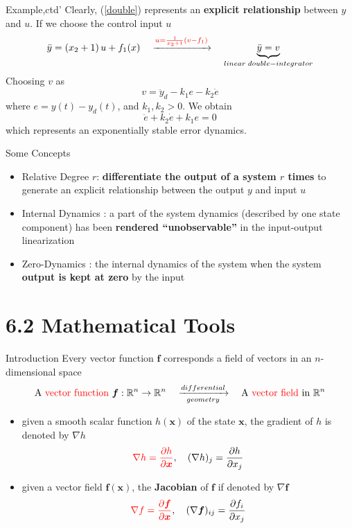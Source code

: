 \documentclass{beamer}
\renewcommand{\vec}[1]{\ensuremath{\boldsymbol{#1}}} %
\begin{document}
\begin{frame}{Example,ctd'}
    Clearly, (\ref{double}) represents an \textbf{explicit relationship} between {\color{red}$y$} and {\color{red}$u$}.  If we choose the control input {\color{red}$u$}
    $$
         \ddot{y}=\left(x_{2}+1\right) u+f_{1}(x) \quad \xrightarrow{ {\color{red}u=\frac{1}{x_{2}+1}\left(v-f_{1}\right)}} \quad \underbrace{\ddot{y} = v}_{\tiny linear~double-integrator}
    $$
    Choosing $v$ as
    \begin{equation}\label{choose-v}
        v = \ddot{y}_{d}-k_{1}e-k_{2}\dot{e}
    \end{equation}
    where $e=y(t)-y_{d}(t)$, and $k_{1}, k_{2} > 0$. We obtain
    $$\ddot{e}+k_{2} \dot{e}+k_{1} e = 0$$
which represents an {\color{red}exponentially stable} error dynamics.
\end{frame}


\begin{frame}{Some Concepts}
    \begin{itemize}
        \item {\color{red}Relative Degree $r$}: \textbf{differentiate the output of a system $r$ times} to generate an explicit relationship between the output $y$ and input $u$
        \item {\color{red}Internal Dynamics} : a part of the system dynamics (described by one state component) has been \textbf{rendered             ``unobservable''} in the input-output linearization
        \item {\color{red}Zero-Dynamics} : the internal dynamics of the system when the system \textbf{output is kept at zero} by the input
    \end{itemize}
\end{frame}

\section{6.2  Mathematical Tools}


\begin{frame}{Introduction}
Every vector function \vec{f} corresponds a field of vectors in an $n$-dimensional space
$$
\text{A {\color{red}vector function}}~\vec{f}:\mathbb{R}^{n}\rightarrow \mathbb{R}^{n} \quad \xrightarrow[geometry]{differential} \quad \text{A {\color{red}vector field} in}~ \mathbb{R}^{n}
$$

\begin{itemize}
  \item given a smooth scalar function $h(\vec{x})$ of the state \vec{x}, the gradient of $h$ is denoted by $\nabla h$
      $$
      {\color{red}\nabla h = \frac{\partial h}{\partial \vec{x}}}, \quad (\nabla h)_{j} = \frac{\partial h}{\partial x_{j}}
      $$
  \item given a vector field $\vec{f}(\vec{x})$, the \textbf{Jacobian} of \vec{f} if denoted by $\nabla \vec{f}$
      $$
      {\color{red}\nabla f = \frac{\partial \vec{f}}{\partial \vec{x}}}, \quad (\nabla \vec{f})_{ij} = \frac{\partial f_{i}}{\partial x_{j}}
      $$
\end{itemize}
\end{frame}
\end{document}
